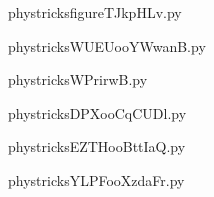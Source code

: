 
    \newcommand{\CaptionFigfigureTJkpHLv}{<+Type your caption here+>}
    \begin{center}
        
    \end{center}
    phystricksfigureTJkpHLv.py

    

    \clearpage
    


    \newcommand{\CaptionFigWUEUooYWwanB}{<+Type your caption here+>}
    \begin{center}
        
    \end{center}
    phystricksWUEUooYWwanB.py

    

    \clearpage
    


    \newcommand{\CaptionFigWPrirwB}{<+Type your caption here+>}
    \begin{center}
        
    \end{center}
    phystricksWPrirwB.py

    

    \clearpage
    


    \newcommand{\CaptionFigDPXooCqCUDl}{<+Type your caption here+>}
    \begin{center}
        
    \end{center}
    phystricksDPXooCqCUDl.py

    

    \clearpage
    


    \newcommand{\CaptionFigEZTHooBttIaQ}{<+Type your caption here+>}
    \begin{center}
        
    \end{center}
    phystricksEZTHooBttIaQ.py

    

    \clearpage
    


    \newcommand{\CaptionFigYLPFooXzdaFr}{<+Type your caption here+>}
    \begin{center}
        
    \end{center}
    phystricksYLPFooXzdaFr.py

